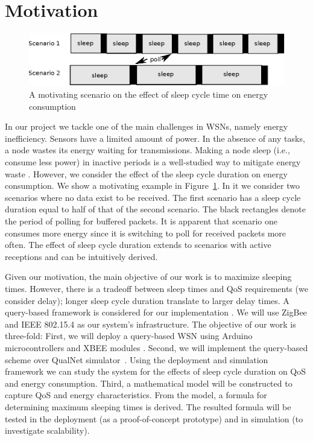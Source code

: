 \section{Motivation} \label{sec:motivation}


\begin{figure}[t]
\centering
\includegraphics[scale=0.65]{figures/drawing.eps}
\caption{A motivating scenario on the effect of sleep cycle time on energy consumption}
\label{fig:motivating}
\end{figure}

In our project we tackle one of the main challenges in WSNs, namely energy inefficiency. Sensors have a limited amount of power. In the absence of any tasks, a node wastes its energy waiting for transmissions. Making a node sleep (i.e., consume less power) in inactive periods is a well-studied way to mitigate energy waste \cite{1}. However, we consider the effect of the sleep cycle duration on energy consumption. We show a motivating example in Figure~\ref{fig:motivating}. In it we consider two scenarios where no data exist to be received. The first scenario has a sleep cycle duration equal to half of that of the second scenario. The black rectangles denote the period of polling for buffered packets. It is apparent that scenario one consumes more energy since it is switching to poll for received packets more often. The effect of sleep cycle duration extends to scenarios with active receptions and can be intuitively derived.  

Given our motivation, the main objective of our work is to maximize sleeping times. However, there is a tradeoff between sleep times and QoS requirements (we consider delay); longer sleep cycle duration translate to larger delay times. A query-based framework is considered for our implementation \cite{2}. We will use ZigBee and IEEE 802.15.4 \cite{3} as our system's infrastructure. The objective of our work is three-fold: First, we will deploy a query-based WSN using Arduino microcontrollers \cite{17} and XBEE modules \cite{18}. Second, we will implement the query-based scheme over QualNet simulator~\cite{16}. Using the deployment and simulation framework we can study the system for the effects of sleep cycle duration on QoS and energy consumption. Third, a mathematical model will be constructed to capture QoS and energy characteristics. From the model, a formula for determining maximum sleeping times is derived. The resulted formula will be tested in the deployment (as a proof-of-concept prototype) and in simulation (to investigate scalability).

